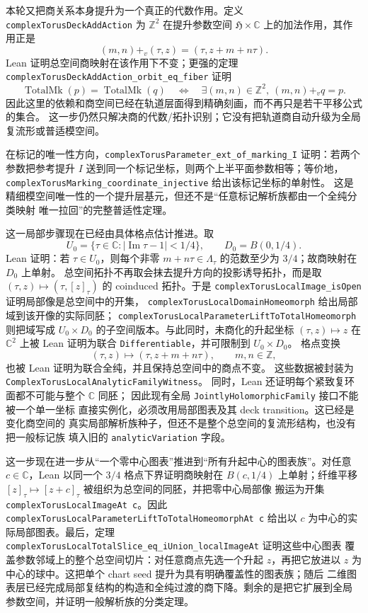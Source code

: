 \documentclass[UTF8,fontset=none,a4paper,11pt]{ctexart}
\begin{document}
本轮又把商关系本身提升为一个真正的代数作用。定义
\texttt{complexTorusDeckAddAction} 为 \(\mathbb Z^2\) 在提升参数空间
\(\mathfrak H\times\mathbb C\) 上的加法作用，其作用正是
\[
  (m,n)\mathbin{+_v}(\tau,z)=(\tau,z+m+n\tau).
\]
Lean 证明总空间商映射在该作用下不变；更强的定理
\texttt{complexTorusDeckAddAction\allowbreak\_orbit\allowbreak\_eq\allowbreak\_fiber} 证明
\[
  \operatorname{TotalMk}(p)=\operatorname{TotalMk}(q)
  \quad\Longleftrightarrow\quad
  \exists (m,n)\in\mathbb Z^2,\ (m,n)\mathbin{+_v}q=p.
\]
因此这里的依赖和商空间已经在轨道层面得到精确刻画，而不再只是若干平移公式的集合。
这一步仍然只解决商的代数/拓扑识别；它没有把轨道商自动升级为全局复流形或普适模空间。

在标记的唯一性方向，\texttt{complexTorusParameter\allowbreak\_ext\allowbreak\_of\allowbreak\_marking\allowbreak\_I} 证明：若两个
参数把参考提升 \(I\) 送到同一个标记坐标，则两个上半平面参数相等；等价地，
\texttt{complexTorusMarking\allowbreak\_coordinate\allowbreak\_injective} 给出该标记坐标的单射性。
这是精细模空间唯一性的一个提升层基元，但还不是“任意标记解析族都由一个全纯分类映射
唯一拉回”的完整普适性定理。

这一局部步骤现在已经由具体格点估计推进。取
\[
  U_0=\{\tau\in\mathbb C:\lvert\operatorname{Im}\tau-1\rvert<1/4\},
  \qquad D_0=B(0,1/4).
\]
Lean 证明：若 \(\tau\in U_0\)，则每个非零
\(m+n\tau\in\Lambda_\tau\) 的范数至少为 \(3/4\)；故商映射在 \(D_0\) 上单射。
总空间拓扑不再取会抹去提升方向的投影诱导拓扑，而是取
\((\tau,z)\mapsto(\tau,[z]_\tau)\) 的 coinduced 拓扑。于是
\texttt{complexTorusLocalImage\_isOpen} 证明局部像是总空间中的开集，
\texttt{complexTorusLocalDomainHomeomorph} 给出局部域到该开像的实际同胚；
\texttt{complexTorusLocalParameterLiftToTotalHomeomorph} 则把域写成
\(U_0\times D_0\) 的子空间版本。与此同时，未商化的升起坐标
\((\tau,z)\mapsto z\) 在 \(\mathbb C^2\) 上被 Lean 证明为联合
\texttt{Differentiable}，并可限制到 \(U_0\times D_0\)。
格点变换
\enlargethispage{3\baselineskip}
\[
  (\tau,z)\longmapsto(\tau,z+m+n\tau),\qquad m,n\in\mathbb Z,
\]
也被 Lean 证明为联合全纯，并且保持总空间中的商点不变。
这些数据被封装为\linebreak
\texttt{ComplexTorusLocalAnalyticFamily\allowbreak Witness}。
同时，Lean 还证明每个紧致复环面都不可能与整个 \(\mathbb C\) 同胚；
因此现有全局 \texttt{JointlyHolomorphicFamily} 接口不能被一个单一坐标
直接实例化，必须改用局部图表及其 deck transition。这已经是变化商空间的
真实局部解析族种子，但还不是整个总空间的复流形结构，也没有把一般标记族
填入旧的 \texttt{analyticVariation} 字段。

这一步现在进一步从“一个零中心图表”推进到“所有升起中心的图表族”。对任意
\(c\in\mathbb C\)，Lean 以同一个 \(3/4\) 格点下界证明商映射在
\(B(c,1/4)\) 上单射；纤维平移
\( [z]_{\tau}\mapsto[z+c]_{\tau} \) 被组织为总空间的同胚，并把零中心局部像
搬运为开集 \texttt{complexTorusLocalImageAt c}。因此
\texttt{complexTorusLocalParameterLiftToTotalHomeomorphAt c} 给出以 \(c\)
为中心的实际局部图表。最后，定理
\texttt{complexTorusLocalTotalSlice\_eq\_iUnion\_localImageAt} 证明这些中心图表
覆盖参数邻域上的整个总空间切片：对任意商点先选一个升起 \(z\)，再把它放进以
\(z\) 为中心的球中。这把单个 chart seed 提升为具有明确覆盖性的图表族；随后
二维图表层已经完成局部复结构的构造和全纯过渡的商下降。剩余的是把它扩展到全局
参数空间，并证明一般解析族的分类定理。
\end{document}
